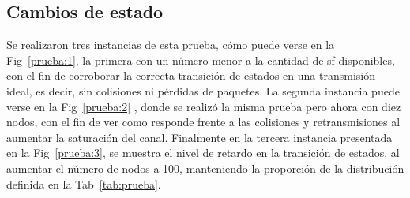 \begin{justify}
\subsection{Cambios de estado}
Se realizaron tres instancias de esta prueba, cómo puede verse en la Fig~\ref{prueba:1}, la primera con un número menor a la cantidad de \gls{sf} disponibles, con el fin de corroborar la correcta transición de estados en una transmisión ideal, es decir, sin colisiones ni pérdidas de paquetes. La segunda instancia puede verse en la Fig~\ref{prueba:2} , donde se realizó la misma prueba pero ahora con diez nodos, con el fin de ver como responde frente a las colisiones y retransmisiones al aumentar la saturación del canal. Finalmente en la tercera instancia presentada en la Fig~\ref{prueba:3}, se muestra el nivel de retardo en la transición de estados, al aumentar el número de nodos a 100, manteniendo la proporción de la distribución definida en la Tab~\ref{tab:prueba}.\\
\begin{figure}[!b]
\centering

\end{figure}
\end{justify}
